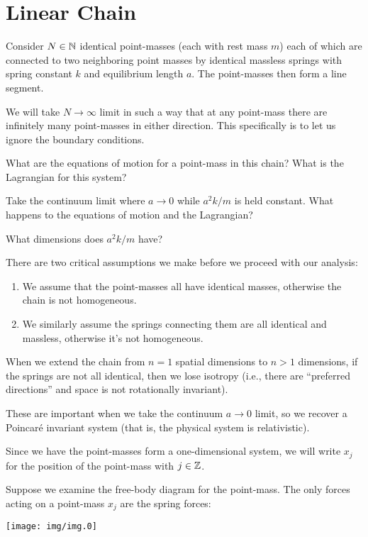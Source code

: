 \section{Linear Chain}

Consider $N\in\mathbb{N}$ identical point-masses (each with rest mass $m$)
each of which are connected to two neighboring point masses by identical
massless springs with spring constant $k$ and equilibrium length $a$.
The point-masses then form a line segment.

We will take $N\to\infty$ limit in such a way that at any point-mass
there are infinitely many point-masses in either direction.
This specifically is to let us ignore the boundary conditions.

What are the equations of motion for a point-mass in this chain? What is
the Lagrangian for this system?

Take the continuum limit where $a\to0$ while $a^{2}k/m$ is held
constant. What happens to the equations of motion and the Lagrangian?

\begin{exercise}
What dimensions does $a^{2}k/m$ have?
\end{exercise}

 There are two critical assumptions we make before we
proceed with our analysis:
\begin{enumerate}
\item 
We assume that the point-masses all have identical masses, otherwise the
chain is not homogeneous.
\item We similarly assume the springs connecting
them are all identical and massless, otherwise it's not
homogeneous.
\end{enumerate}
When we extend the chain from $n=1$ spatial dimensions to
$n>1$ dimensions, if the springs are not all identical, then we lose isotropy (i.e., there are ``preferred directions''
and space is not rotationally invariant).

These are important when we take the continuum $a\to0$ limit, so we
recover a Poincar\'e invariant system (that is, the physical system is
relativistic). 

Since we have the point-masses form a one-dimensional system, we will
write $x_{j}$ for the position of the point-mass with $j\in\mathbb{Z}$.

Suppose we examine the free-body diagram for the point-mass. The only
forces acting on a point-mass $x_{j}$ are the spring forces:
\begin{center}
\texttt{[image: img/img.0]}
\end{center}


